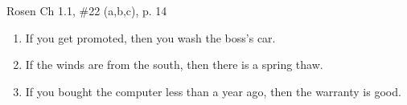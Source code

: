 \documentclass[12pt,addpoints]{exam}
\begin{document}
\begin{questions}
\begin{solution}
    \end{solution}


\question Rosen Ch 1.1, \#22 (a,b,c), p. 14
    \ifprintanswers
        \vspace{-15pt}
    \fi
    \begin{solution}
    \begin{enumerate}[label=(\alph*),itemsep=0pt,parsep=0pt,
    topsep=0pt,partopsep=0pt]
        \item If you get promoted, then you wash the boss's car.
        \item If the winds are from the south, then there is a spring thaw.
        \item If you bought the computer less than a year ago, then the warranty is good.
    \end{enumerate}
    \end{solution}



\end{questions}
\end{document}

